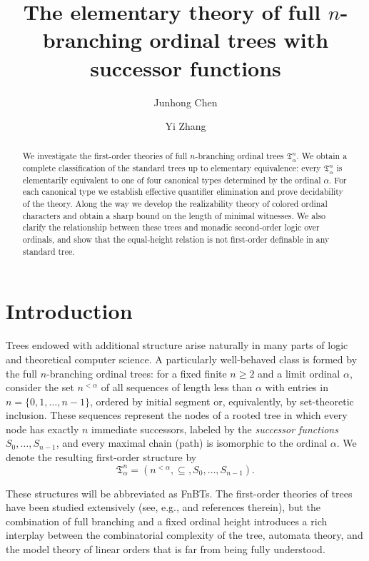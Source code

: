 \documentclass{amsart}
\title[The elementary theory of FnBTs]{The elementary theory of full $n$-branching ordinal trees with successor functions}
\author[Chen]{Junhong Chen}
\author[Zhang]{Yi Zhang}
\theoremstyle{definition}
\begin{document}
\begin{abstract}
    We investigate the first-order theories of full \(n\)-branching ordinal trees \(\mathfrak{T}_\alpha^n\). We obtain a complete classification of the standard trees up to elementary equivalence: every \(\mathfrak{T}_\alpha^n\) is elementarily equivalent to one of four canonical types determined by the ordinal \(\alpha\). For each canonical type we establish effective quantifier elimination and prove decidability of the theory. Along the way we develop the realizability theory of colored ordinal characters and obtain a sharp bound on the length of minimal witnesses. We also clarify the relationship between these trees and monadic second-order logic over ordinals, and show that the equal-height relation is not first-order definable in any standard tree.
\end{abstract}

\maketitle
\pagestyle{plain}

\tableofcontents

\newcommand\YZ[1]{{\color{red}(YZ: #1)}}
\newcommand\CJ[1]{{\color{green}(CJ: #1)}}

\section{Introduction}\label{sec:introduction}

Trees endowed with additional structure arise naturally in many parts of logic and theoretical computer science. A particularly well-behaved class is formed by the full $n$-branching ordinal trees: for a fixed finite $n\geq 2$ and a limit ordinal $\alpha$, consider the set $n^{<\alpha}$ of all sequences of length less than $\alpha$ with entries in $n=\{0,1,\dots,n-1\}$, ordered by initial segment or, equivalently, by set-theoretic inclusion. These sequences represent the nodes of a rooted tree in which every node has exactly $n$ immediate successors, labeled by the \emph{successor functions} $S_0,\dots,S_{n-1}$, and every maximal chain (path) is isomorphic to the ordinal $\alpha$. We denote the resulting first-order structure by
$$\mathfrak{T}_\alpha^n=(n^{<\alpha},\subseteq,S_0,\dots,S_{n-1}).$$

These structures will be abbreviated as FnBTs. The first-order theories of trees have been studied extensively (see, e.g., \cite{Kellerman2021,KellermanGoranko2021} and references therein), but the combination of full branching and a fixed ordinal height introduces a rich interplay between the combinatorial complexity of the tree, automata theory, and the model theory of linear orders that is far from being fully understood.
\end{document}
